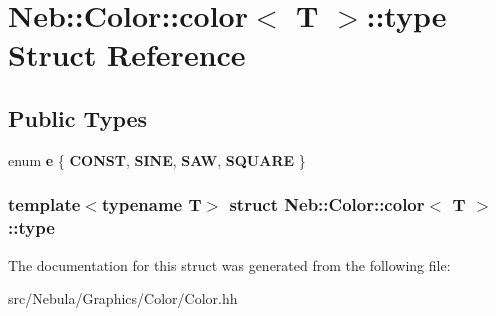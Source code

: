 \hypertarget{structNeb_1_1Color_1_1color_1_1type}{\section{\-Neb\-:\-:\-Color\-:\-:color$<$ \-T $>$\-:\-:type \-Struct \-Reference}
\label{structNeb_1_1Color_1_1color_1_1type}
}
\subsection*{\-Public \-Types}
\begin{DoxyCompactItemize}
\item 
enum {\bfseries e} \{ {\bfseries \-C\-O\-N\-S\-T}, 
{\bfseries \-S\-I\-N\-E}, 
{\bfseries \-S\-A\-W}, 
{\bfseries \-S\-Q\-U\-A\-R\-E}
 \}
\end{DoxyCompactItemize}
\subsubsection*{template$<$typename \-T$>$ struct Neb\-::\-Color\-::color$<$ T $>$\-::type}



\-The documentation for this struct was generated from the following file\-:\begin{DoxyCompactItemize}
\item 
src/\-Nebula/\-Graphics/\-Color/\-Color.\-hh\end{DoxyCompactItemize}
